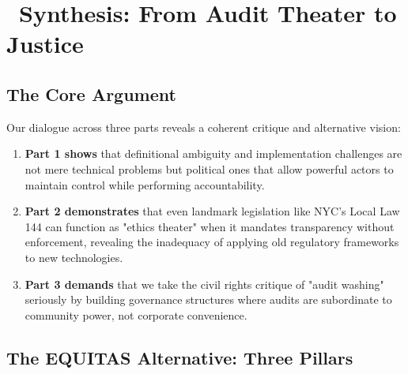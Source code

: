 \documentclass[12pt,letterpaper]{article}
\begin{document}
\newpage

\section*{\color{traumahealing}\faGlobe\ Synthesis: From Audit Theater to Justice}

\subsection*{The Core Argument}

Our dialogue across three parts reveals a coherent critique and alternative vision:

\begin{enumerate}[leftmargin=*,noitemsep,topsep=2pt]
    \item \textbf{Part 1 shows} that definitional ambiguity and implementation challenges are not mere technical problems but political ones that allow powerful actors to maintain control while performing accountability.
    
    \item \textbf{Part 2 demonstrates} that even landmark legislation like NYC's Local Law 144 can function as "ethics theater" when it mandates transparency without enforcement, revealing the inadequacy of applying old regulatory frameworks to new technologies.
    
    \item \textbf{Part 3 demands} that we take the civil rights critique of "audit washing" seriously by building governance structures where audits are subordinate to community power, not corporate convenience.
\end{enumerate}

\subsection*{The EQUITAS Alternative: Three Pillars}
\end{document}
